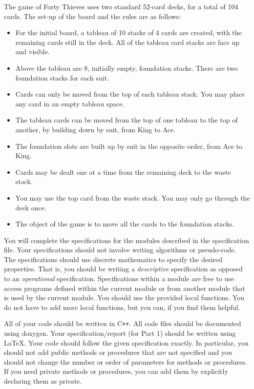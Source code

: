 \documentclass[12pt]{article}
\newcommand\CC{C\texttt{++}}
\begin{document}
The game of Forty Thieves uses two standard 52-card decks, for a total of 104
cards.  The set-up of the board and the rules are as follows:
\begin{itemize}
\item For the initial board, a tableau of 10 stacks of 4 cards are created, with
  the remaining cards still in the deck.  All of the tableau card stacks are
  face up and visible.
\item Above the tableau are 8, initially empty, foundation stacks.  There are
  two foundation stacks for each suit.
\item Cards can only be moved from the top of each tableau stack.  You may place
  any card in an empty tableau space.
\item The tableau cards can be moved from the top of one tableau to the top of
  another, by building down by suit, from King to Ace.
\item The foundation slots are built up by suit in the opposite order, from Ace
  to King.
\item Cards may be dealt one at a time from the remaining deck to the waste
  stack.
\item You may use the top card from the waste stack.  You may only go through
  the deck once.
\item The object of the game is to move all the cards to the foundation stacks.
\end{itemize}

You will complete the specifications for the modules described in the
specification file.  Your specifications should not involve writing algorithms
or pseudo-code.  The specifications should use discrete mathematics to specify
the desired properties.  That is, you should be writing a {\it descriptive}
specification as opposed to an {\it operational} specification.  Specifications
within a module are free to use access programs defined within the current
module or from another module that is used by the current module.  You should
use the provided local functions.  You do not have to add more local
functions, but you can, if you find them helpful.

All of your code should be written in \CC{}.  All code files should be documented
using doxygen.  Your specification/report (for Part 1) should be written using
\LaTeX.  Your code should follow the given specification exactly.  In
particular, you should not add public methods or procedures that are not
specified and you should not change the number or order of parameters for
methods or procedures.  If you need private methods or procedures, you can add
them by explicitly declaring them as private.
\end{document}
